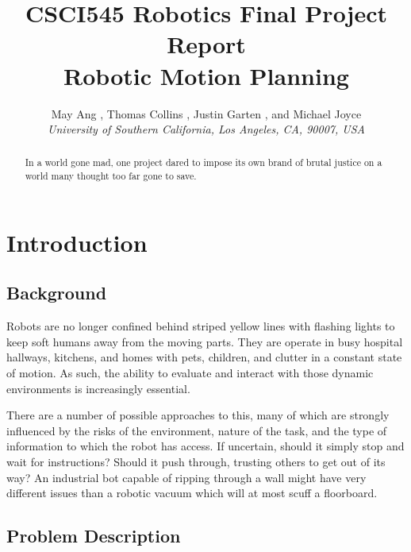 \documentclass{aiaa-tc}%
\begin{document}
\title{CSCI545 Robotics Final Project Report\\
	Robotic Motion Planning}

 \author
{		May Ang%
		\hspace{3pt},
		Thomas Collins%
		\hspace{3pt},
		Justin Garten%
		\hspace{3pt},
		and Michael Joyce%
		\\
		\normalsize\itshape
		University of Southern California, Los Angeles, CA, 90007, USA\\
}
\maketitle

\begin{abstract}
In a world gone mad, one project dared to impose its own brand of
brutal justice on a world many thought too far gone to save.
\end{abstract}

\section{Introduction}
\label{Introduction}

\subsection{Background}

Robots are no longer confined behind striped yellow lines
with flashing lights to keep soft humans away from the moving
parts. They are operate in busy hospital hallways, kitchens, and homes
with pets, children, and clutter in a constant state of motion. As
such, the ability to evaluate and interact with those dynamic environments is
increasingly essential.

There are a number of possible approaches to this, many of which are
strongly influenced by the risks of the environment, nature of the
task, and the type of information to which the robot has
access. If uncertain, should it simply stop and wait for instructions?
Should it push through, trusting others to get out of its way? An
industrial bot capable of ripping through a wall might have very
different issues than a robotic vacuum which will at most scuff a
floorboard.

\subsection{Problem Description}
\end{document}
